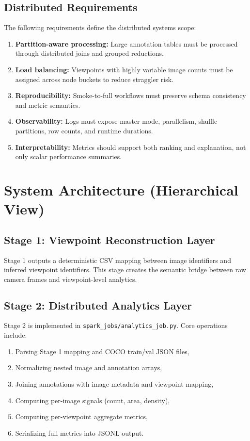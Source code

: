 \documentclass[journal,onecolumn]{IEEEtran}
\begin{document}
\subsection{Distributed Requirements}
The following requirements define the distributed systems scope:
\begin{enumerate}
    \item \textbf{Partition-aware processing:} Large annotation tables must be processed through distributed joins and grouped reductions.
    \item \textbf{Load balancing:} Viewpoints with highly variable image counts must be assigned across node buckets to reduce straggler risk.
    \item \textbf{Reproducibility:} Smoke-to-full workflows must preserve schema consistency and metric semantics.
    \item \textbf{Observability:} Logs must expose master mode, parallelism, shuffle partitions, row counts, and runtime durations.
    \item \textbf{Interpretability:} Metrics should support both ranking and explanation, not only scalar performance summaries.
\end{enumerate}

\section{System Architecture (Hierarchical View)}

\subsection{Stage 1: Viewpoint Reconstruction Layer}
Stage 1 outputs a deterministic CSV mapping between image identifiers and inferred viewpoint identifiers. This stage creates the semantic bridge between raw camera frames and viewpoint-level analytics.

\subsection{Stage 2: Distributed Analytics Layer}
Stage 2 is implemented in \texttt{spark\_jobs/analytics\_job.py}. Core operations include:
\begin{enumerate}
    \item Parsing Stage 1 mapping and COCO train/val JSON files,
    \item Normalizing nested image and annotation arrays,
    \item Joining annotations with image metadata and viewpoint mapping,
    \item Computing per-image signals (count, area, density),
    \item Computing per-viewpoint aggregate metrics,
    \item Serializing full metrics into JSONL output.
\end{enumerate}
\end{document}
